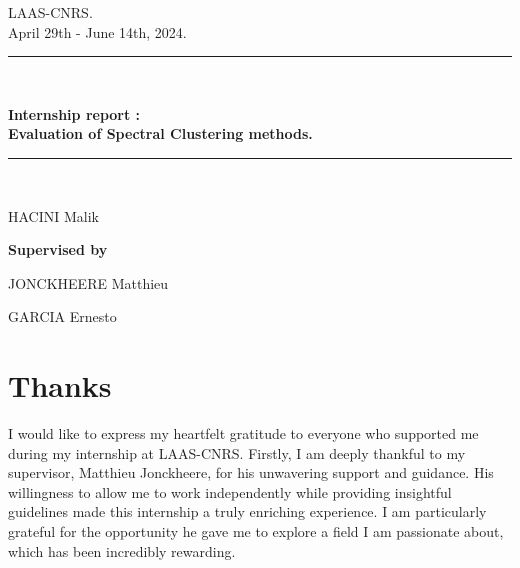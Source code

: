 \documentclass[a4paper,12pt]{article}
\date{June 7, 2024.}
\theoremstyle{definition}
\theoremstyle{plain}
\begin{document}
\begin{titlepage}
	\centering
	\vspace*{3cm}
	{\large LAAS-CNRS.\\
		April 29th - June 14th, 2024.
		\par}
	\rule{0.6\textwidth}{2pt}\\
	{\huge\bfseries Internship report : \\ Evaluation of Spectral Clustering methods. \\\par}
	\rule{0.6\textwidth}{2pt}\\
	\vspace{2cm}
	{\large
		HACINI Malik
		\par }
	\vspace{1cm}
	{\Large\bfseries Supervised by\par} \:
	{\large JONCKHEERE Matthieu\par}
	{\large GARCIA Ernesto\par}
	
\end{titlepage}

\begin{abstract}
	During my internship at LAAS-CNRS in Toulouse, I focused on exploring and implementing Spectral Clustering algorithms. This report begins with an introduction to the laboratory and outlines the objectives of my internship. I then delve into the technical aspects, starting with an overview of the fundamental theory behind Spectral Clustering. Following this, I describe my implementation of the algorithm in Python and detail the experiments conducted on synthetic datasets to evaluate its performance.
	
	The report further introduces Generalized Spectral Clustering (GSC), a novel framework developed at LAAS. I explain the theoretical ideas and improvements offered by GSC over traditional Spectral Clustering methods. To test and demonstrate the efficacy of GSC, I present experiments performed on both synthetic and real-life datasets.
	
	Overall, this report provides a comprehensive analysis of Spectral Clustering techniques, from basic theory to practical implementation and experimentation, culminating in an exploration of the advanced Generalized Spectral Clustering framework.
	

\end{abstract}
\newpage
\section*{Thanks}
I would like to express my heartfelt gratitude to everyone who supported me during my internship at LAAS-CNRS. Firstly, I am deeply thankful to my supervisor, Matthieu Jonckheere, for his unwavering support and guidance. His willingness to allow me to work independently while providing insightful guidelines made this internship a truly enriching experience. I am particularly grateful for the opportunity he gave me to explore a field I am passionate about, which has been incredibly rewarding.
\end{document}
